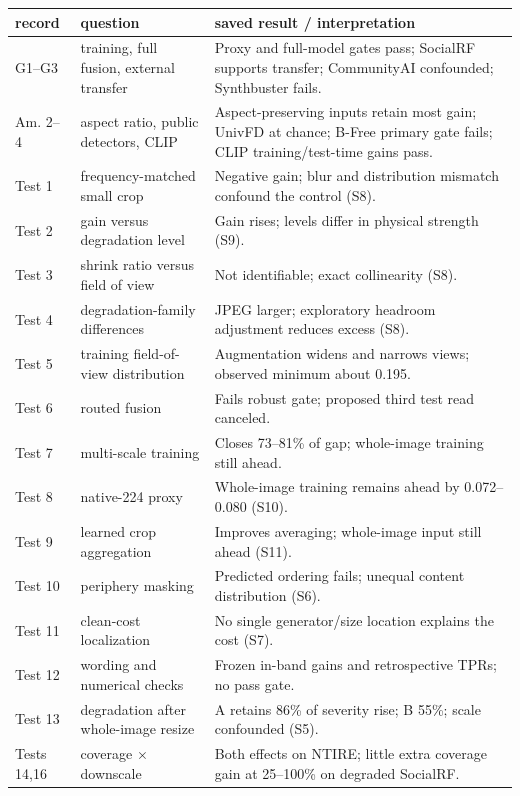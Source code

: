 \documentclass[letterpaper]{article}
\begin{document}
\begin{table}[t]
\centering\footnotesize
\begin{tabular}{p{}p{}p{}}
\toprule
record & question & saved result / interpretation \\
\midrule
G1--G3 & training, full fusion, external transfer & Proxy and full-model gates pass; SocialRF supports transfer; CommunityAI confounded; Synthbuster fails. \\
Am. 2--4 & aspect ratio, public detectors, CLIP & Aspect-preserving inputs retain most gain; UnivFD at chance; B-Free primary gate fails; CLIP training/test-time gains pass. \\
Test 1 & frequency-matched small crop & Negative gain; blur and distribution mismatch confound the control (S8). \\
Test 2 & gain versus degradation level & Gain rises; levels differ in physical strength (S9). \\
Test 3 & shrink ratio versus field of view & Not identifiable; exact collinearity (S8). \\
Test 4 & degradation-family differences & JPEG larger; exploratory headroom adjustment reduces excess (S8). \\
Test 5 & training field-of-view distribution & Augmentation widens and narrows views; observed minimum about 0.195. \\
Test 6 & routed fusion & Fails robust gate; proposed third test read canceled. \\
Test 7 & multi-scale training & Closes 73--81\% of gap; whole-image training still ahead. \\
Test 8 & native-224 proxy & Whole-image training remains ahead by 0.072--0.080 (S10). \\
Test 9 & learned crop aggregation & Improves averaging; whole-image input still ahead (S11). \\
Test 10 & periphery masking & Predicted ordering fails; unequal content distribution (S6). \\
Test 11 & clean-cost localization & No single generator/size location explains the cost (S7). \\
Test 12 & wording and numerical checks & Frozen in-band gains and retrospective TPRs; no pass gate. \\
Test 13 & degradation after whole-image resize & A retains 86\% of severity rise; B 55\%; scale confounded (S5). \\
Tests 14,16 & coverage $\times$ downscale & Both effects on NTIRE; little extra coverage gain at 25--100\% on degraded SocialRF. \\

\end{tabular}
\end{table}
\end{document}

